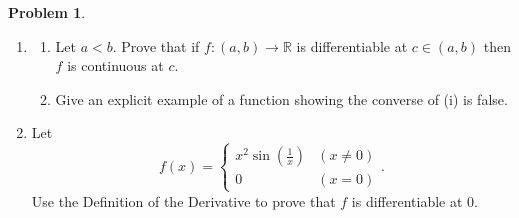 \documentclass[12pt]{article}
\theoremstyle{definition}
\newtheorem{problem}{Problem}
\begin{document}
\begin{problem}
    \hfill 
    \begin{enumerate}[label=(\alph*)]
        \item \begin{enumerate}[label=(\roman*)]
            \item Let \(a < b\). Prove that if \(f : (a, b) \to \mathbb{R}\) is diﬀerentiable at \(c \in (a, b)\) then \(f\) is continuous at \(c\).
            \item Give an explicit example of a function showing the converse of (i) is false.
        \end{enumerate}
        \item Let
        \[
            f(x) = \begin{cases}
                x^2\sin(\frac{1}{x}) & (x \neq 0) \\
                0 & (x = 0)
            \end{cases}.
        \]
        Use the Definition of the Derivative to prove that \(f\) is differentiable at \(0\).
    \end{enumerate}
\end{problem}
\end{document}
